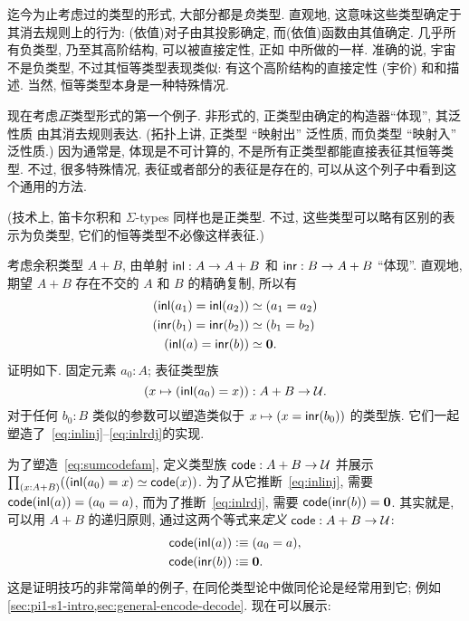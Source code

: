 %
%
迄今为止考虑过的类型的形式, 大部分都是\emph{负}类型.
%
%
直观地, 这意味这些类型确定于其消去规则上的行为: (依值)对子由其投影确定, 而(依值)函数由其值确定.
几乎所有负类型, 乃至其高阶结构, 可以被直接定性, 正如 中所做的一样.
准确的说, 宇宙不是负类型, 不过其恒等类型表现类似: 有这个高阶结构的直接定性 (宇价) 和和描述.
当然, 恒等类型本身是一种特殊情况.

现在考虑\emph{正}类型形式的第一个例子.
%
非形式的, 正类型由确定的构造器``体现'', 其泛性质 由其消去规则表达.
(拓扑上讲, 正类型 ``映射出'' 泛性质, 而负类型 ``映射入'' 泛性质.)
因为通常是, 体现是不可计算的, 不是所有正类型都能直接表征其恒等类型.
不过, 很多特殊情况, 表征或者部分的表征是存在的, 可以从这个列子中看到这个通用的方法.

(技术上, 笛卡尔积和 $\Sigma$-types 同样也是正类型.
不过, 这些类型可以略有区别的表示为负类型, 它们的恒等类型不必像这样表征.)

考虑余积类型 $A+B$, 由单射 ${\mathsf{inl}}:A\to A+B$ 和 ${\mathsf{inr}}:B\to A+B$ ``体现''.
直观地, 期望 $A+B$ 存在不交的 $A$ 和 $B$ 的精确复制, 所以有
\begin{align}
{(\inl(a_1)=\inl(a_2))}
    &\eqvsym {(a_1=a_2)} \label{eq:inlinj}\\
    {(\inr(b_1)=\inr(b_2))}&\eqvsym {(b_1=b_2)}\\
    {(\inl(a)= \inr(b))} &\eqvsym {\emptyt}. \label{eq:inlrdj}
\end{align}
证明如下.
固定元素 $a_0:A$; 表征类型族
\begin{equation}
(x\mapsto (\inl(a_0)=x))
    : A+B \to \type.\label{eq:sumcodefam}
\end{equation}
对于任何 $b_0:B$ 类似的参数可以塑造类似于 $x\mapsto (x = {\mathsf{inr}}(b_0))$ 的类型族.
它们一起塑造了~\eqref{eq:inlinj}--\eqref{eq:inlrdj}的实现.

为了塑造~\eqref{eq:sumcodefam}, 定义类型族 $\mathsf{code}:A+B\to\mathcal{U}$ 并展示 $\prd{x:A+B} (\eqv{(\inl(a_0)=x)}{\code(x)})$.
为了从它推断~\eqref{eq:inlinj}, 需要 $\mathsf{code}({\mathsf{inl}}(a)) = (a_0=a)$, 而为了推断~\eqref{eq:inlrdj}, 需要 $\mathsf{code} ({\mathsf{inr}}(b)) = \mathbf{0}$.
其实就是, 可以用 $A+B$ 的递归原则, 通过这两个等式来\emph{定义} $\mathsf{code}:A+B\to\mathcal{U}$:
\begin{align*}
    \mathsf{code}({\mathsf{inl}}(a)) &\vcentcolon\equiv (a_0=a),\\
    \mathsf{code}({\mathsf{inr}}(b)) &\vcentcolon\equiv \mathbf{0}.
\end{align*}
这是证明技巧的非常简单的例子, 在同伦类型论中做同伦论是经常用到它;
例如 \cref{sec:pi1-s1-intro,sec:general-encode-decode}.
%
现在可以展示:

